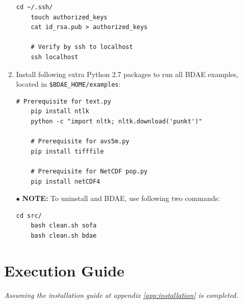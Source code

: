 \begin{enumerate}
	\begin{lstlisting}[numbers=none, backgroundcolor=\color{sourcebackground}, rulecolor=\color{sourcebackground}, framextopmargin=5pt, framexbottommargin=5pt, frame=tb, xrightmargin=15pt, commentstyle=\color{bashcommetcolor}]
	cd ~/.ssh/
	touch authorized_keys
	cat id_rsa.pub > authorized_keys
	
	# Verify by ssh to localhost
	ssh localhost
	\end{lstlisting}
	\vspace*{-6mm}
	\item Install following extra Python 2.7 packages to run all BDAE examples, located in \texttt{\$BDAE\_HOME/examples}:

	\begin{lstlisting}[numbers=none, backgroundcolor=\color{sourcebackground}, rulecolor=\color{sourcebackground}, framextopmargin=5pt, framexbottommargin=5pt, frame=tb, xrightmargin=15pt, commentstyle=\color{bashcommetcolor}, showstringspaces=false]
	# Prerequisite for text.py
	pip install ntlk
	python -c "import nltk; nltk.download('punkt')"
	
	# Prerequisite for avs5m.py
	pip install tifffile
		
	# Prerequisite for NetCDF pop.py
	pip install netCDF4
	\end{lstlisting}
	\vspace*{-6mm}
	\item[$\bullet$] {\sffamily\textbf{NOTE:}} To uninstall \CodeName and BDAE, use following two commands:
	\begin{lstlisting}[numbers=none, backgroundcolor=\color{sourcebackground}, rulecolor=\color{sourcebackground}, framextopmargin=5pt, framexbottommargin=5pt, frame=tb, xrightmargin=15pt, commentstyle=\color{bashcommetcolor}, showstringspaces=false]
	cd src/
	bash clean.sh sofa
	bash clean.sh bdae		
	\end{lstlisting}
\end{enumerate}


\chapter{Execution Guide} \label{app:execution}
{\footnotesize \textit{Assuming the installation guide at appendix \ref{app:installation} is completed.}}
\newline

